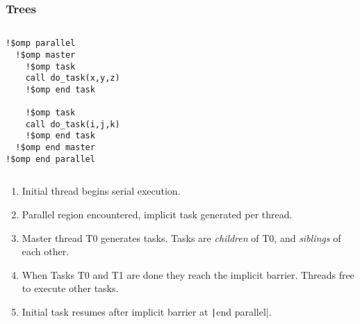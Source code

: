 \documentclass{beamer}
\begin{document}
\begin{frame}[fragile]
\frametitle{Trees}

\begin{columns}
\begin{column}{0.5\textwidth}
\begin{verbatim}
!$omp parallel
  !$omp master
    !$omp task
    call do_task(x,y,z)
    !$omp end task

    !$omp task
    call do_task(i,j,k)
    !$omp end task
  !$omp end master
!$omp end parallel
\end{verbatim}
\end{column}

\begin{column}{0.5\textwidth}
\end{column}
\end{columns}

\begin{enumerate}
  \item<2-> Initial thread begins serial execution.
  \item<3-> Parallel region encountered, implicit task generated per thread.
  \item<4-> Master thread T0 generates tasks. Tasks are \emph{children} of T0, and \emph{siblings} of each other.
  \item<5-> When Tasks T0 and T1 are done they reach the implicit barrier. Threads free to execute other tasks.
  \item<6-> Initial task resumes after implicit barrier at \texttt|end parallel|.
\end{enumerate}

\end{frame}
\end{document}
